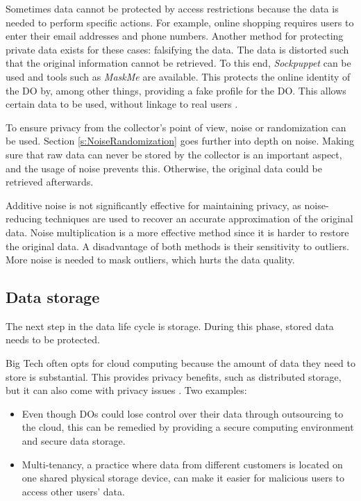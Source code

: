 Sometimes data cannot be protected by access restrictions because the data is needed to perform specific actions. 
For example, online shopping requires users to enter their email addresses and phone numbers. 
Another method for protecting private data exists for these cases: falsifying the data.
The data is distorted such that the original information cannot be retrieved. 
To this end, \textit{Sockpuppet} can be used and tools such as \textit{MaskMe} \cite{downey_2013} are available.
This protects the online identity of the \gls{DO} by, among other things, providing a fake profile for the \gls{DO}.
This allows certain data to be used, without linkage to real users \cite{Jain2016}.  

To ensure privacy from the collector's point of view, noise or randomization \cite{Mendes2017} can be used.
Section \ref{s:NoiseRandomization} goes further into depth on noise.
Making sure that raw data can never be stored by the collector is an important aspect, and the usage of noise prevents this.
Otherwise, the original data could be retrieved afterwards. 

Additive noise is not significantly effective for maintaining privacy, as noise-reducing techniques are used to recover an accurate approximation of the original data. 
Noise multiplication is a more effective method since it is harder to restore the original data.
A disadvantage of both methods is their sensitivity to outliers.
More noise is needed to mask outliers, which hurts the data quality.


\subsection{Data storage}

The next step in the data life cycle is storage.
During this phase, stored data needs to be protected.

Big Tech often opts for cloud computing because the amount of data they need to store is substantial.
This provides privacy benefits, such as distributed storage, but it can also come with privacy issues \cite{Mehmood2016}.
Two examples:
\begin{itemize}

    \item 
		 Even though \gls{DO}s could lose control over their data through outsourcing to the cloud,
		 this can be remedied by providing a secure computing environment and secure data storage.
    
    \item 
		 Multi-tenancy, a practice where data from different customers is located on one shared physical storage device, 
		 can make it easier for malicious users to access other users' data.
    
\end{itemize}

